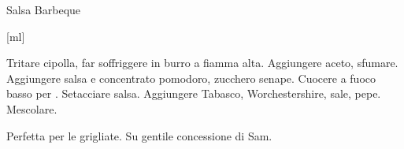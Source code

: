 \begin{recipe}{Salsa Barbeque}
    \begin{header}
        [ml]
    
    \end{header}
    
    \begin{ingredients}[10]
    \end{ingredients}
    
    \begin{preparation}
        \step Tritare cipolla, far soffriggere in burro a fiamma alta.
        \step Aggiungere aceto, sfumare.
        \step Aggiungere salsa e concentrato pomodoro, zucchero senape.
        \step Cuocere a fuoco basso per .
        \step Setacciare salsa.
        \step Aggiungere Tabasco, Worchestershire, sale, pepe.
        \step Mescolare.
    \end{preparation}
    
    \begin{hint}
        Perfetta per le grigliate. Su gentile concessione di Sam.
    \end{hint}
\end{recipe}
